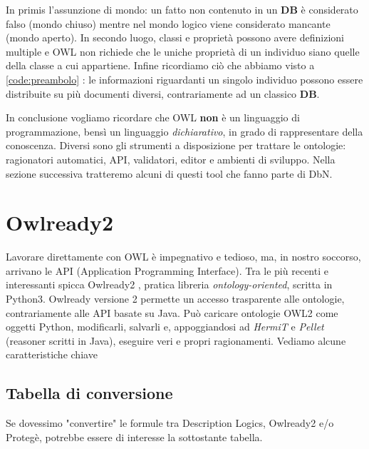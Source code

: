 In primis l'assunzione di mondo: un fatto non contenuto in un \textbf{DB} è considerato falso (mondo chiuso) mentre nel mondo
logico viene considerato mancante (mondo aperto). In secondo luogo, classi e proprietà possono avere definizioni multiple e OWL non richiede che le uniche proprietà di un individuo siano quelle della classe a cui appartiene.
Infine ricordiamo ciò che abbiamo visto a \ref{code:preambolo} : le informazioni riguardanti un singolo individuo 
possono essere distribuite su più documenti diversi, contrariamente ad un classico \textbf{DB}.

In conclusione vogliamo ricordare che OWL \textbf{non} è un linguaggio di programmazione, bensì
un linguaggio \textit{dichiarativo}, in grado di rappresentare della conoscenza. Diversi sono gli strumenti
a disposizione per trattare le ontologie: ragionatori automatici, API, validatori, editor e ambienti di sviluppo.
Nella sezione successiva tratteremo alcuni di questi tool che fanno parte di DbN.  

\section{Owlready2} \label{sec: OwlR2}
Lavorare direttamente con OWL è impegnativo e tedioso, ma, in nostro soccorso, arrivano le API (Application Programming Interface).
Tra le più recenti e interessanti spicca Owlready2 \cite{OwlReady}, pratica libreria \textit{ontology-oriented}, scritta in Python3. Owlready versione 2 permette un accesso trasparente alle ontologie, contrariamente alle API basate su Java.
Può caricare ontologie OWL2 come oggetti Python, modificarli, salvarli e, appoggiandosi ad  \textit{HermiT} e \textit{Pellet} (reasoner scritti in Java), eseguire veri e propri ragionamenti.
Vediamo alcune caratteristiche chiave

\subsection{Tabella di conversione}
Se dovessimo "convertire" le formule tra Description Logics, Owlready2 e/o Protegè,
potrebbe essere di interesse la sottostante tabella.

